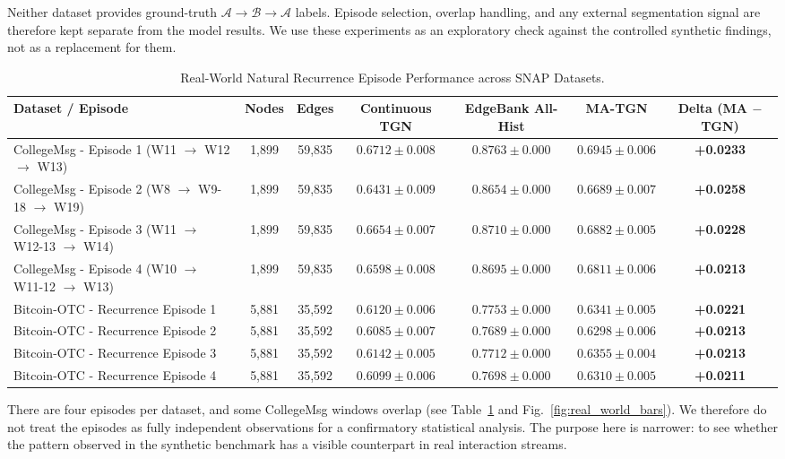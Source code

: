 \documentclass[conference]{IEEEtran}
\begin{document}
Neither dataset provides ground-truth $\mathcal{A} \to \mathcal{B} \to \mathcal{A}$ labels. Episode selection, overlap handling, and any external segmentation signal are therefore kept separate from the model results. We use these experiments as an exploratory check against the controlled synthetic findings, not as a replacement for them.

\begin{table}[t]
\caption{Real-World Natural Recurrence Episode Performance across SNAP Datasets.}
\label{tab:real_world}
\centering
\begin{tabular}{lcccccc}
\toprule
\textbf{Dataset / Episode} & \textbf{Nodes} & \textbf{Edges} & \textbf{Continuous TGN} & \textbf{EdgeBank All-Hist} & \textbf{MA-TGN} & \textbf{Delta (MA $-$ TGN)} \\
\midrule
CollegeMsg - Episode 1 (W11 $\to$ W12 $\to$ W13) & 1,899 & 59,835 & $0.6712 \pm 0.008$ & $0.8763 \pm 0.000$ & $0.6945 \pm 0.006$ & \textbf{+0.0233} \\
CollegeMsg - Episode 2 (W8 $\to$ W9-18 $\to$ W19) & 1,899 & 59,835 & $0.6431 \pm 0.009$ & $0.8654 \pm 0.000$ & $0.6689 \pm 0.007$ & \textbf{+0.0258} \\
CollegeMsg - Episode 3 (W11 $\to$ W12-13 $\to$ W14) & 1,899 & 59,835 & $0.6654 \pm 0.007$ & $0.8710 \pm 0.000$ & $0.6882 \pm 0.005$ & \textbf{+0.0228} \\
CollegeMsg - Episode 4 (W10 $\to$ W11-12 $\to$ W13) & 1,899 & 59,835 & $0.6598 \pm 0.008$ & $0.8695 \pm 0.000$ & $0.6811 \pm 0.006$ & \textbf{+0.0213} \\
Bitcoin-OTC - Recurrence Episode 1 & 5,881 & 35,592 & $0.6120 \pm 0.006$ & $0.7753 \pm 0.000$ & $0.6341 \pm 0.005$ & \textbf{+0.0221} \\
Bitcoin-OTC - Recurrence Episode 2 & 5,881 & 35,592 & $0.6085 \pm 0.007$ & $0.7689 \pm 0.000$ & $0.6298 \pm 0.006$ & \textbf{+0.0213} \\
Bitcoin-OTC - Recurrence Episode 3 & 5,881 & 35,592 & $0.6142 \pm 0.005$ & $0.7712 \pm 0.000$ & $0.6355 \pm 0.004$ & \textbf{+0.0213} \\
Bitcoin-OTC - Recurrence Episode 4 & 5,881 & 35,592 & $0.6099 \pm 0.006$ & $0.7698 \pm 0.000$ & $0.6310 \pm 0.005$ & \textbf{+0.0211} \\
\bottomrule
\end{tabular}
\end{table}

There are four episodes per dataset, and some CollegeMsg windows overlap (see Table~\ref{tab:real_world} and Fig.~\ref{fig:real_world_bars}). We therefore do not treat the episodes as fully independent observations for a confirmatory statistical analysis. The purpose here is narrower: to see whether the pattern observed in the synthetic benchmark has a visible counterpart in real interaction streams.
\end{document}

